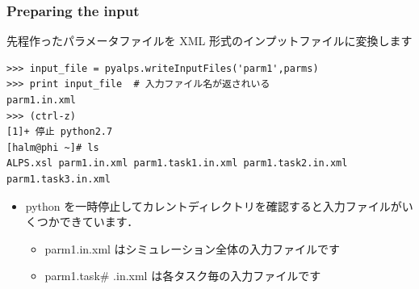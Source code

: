 
\begin{frame}[t,fragile]
\frametitle{Preparing the input}
先程作ったパラメータファイルを XML 形式のインプットファイルに変換します
\begin{lstlisting}
>>> input_file = pyalps.writeInputFiles('parm1',parms)
>>> print input_file  # 入力ファイル名が返されいる
parm1.in.xml
>>> (ctrl-z)
[1]+ 停止 python2.7
[halm@phi ~]# ls
ALPS.xsl parm1.in.xml parm1.task1.in.xml parm1.task2.in.xml parm1.task3.in.xml

\end{lstlisting}
\begin{itemize}
\item python を一時停止してカレントディレクトリを確認すると入力ファイルがいくつかできています．
  \begin{itemize}
  \item parm1.in.xml はシミュレーション全体の入力ファイルです
  \item parm1.task\# .in.xml は各タスク毎の入力ファイルです
  \end{itemize}
\end{itemize}

\end{frame}

